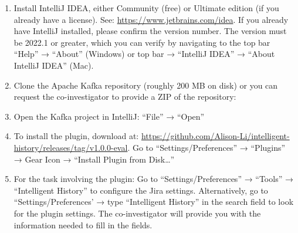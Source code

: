 \begin{enumerate}
    \item Install IntelliJ IDEA, either Community (free) or Ultimate edition (if you already have a license). See: \url{https://www.jetbrains.com/idea}. If you already have IntelliJ installed, please confirm the version number. The version must be 2022.1 or greater, which you can verify by navigating to the top bar  ``Help'' → ``About'' (Windows) or top bar → ``IntelliJ IDEA'' → ``About IntelliJ IDEA'' (Mac).
    \item Clone the Apache Kafka repository (roughly 200 MB on disk) or you can request the co-investigator to provide a ZIP of the repository: 
    
    \begin{center}
    \end{center}

    \item Open the Kafka project in IntelliJ: ``File'' → ``Open''
    \item To install the plugin, download  at: \url{https://github.com/Alison-Li/intelligent-history/releases/tag/v1.0.0-eval}. Go to “Settings/Preferences” → ``Plugins'' → Gear Icon → ``Install Plugin from Disk\dots''
    \item For the task involving the plugin: Go to ``Settings/Preferences'' → ``Tools'' → ``Intelligent History'' to configure the Jira settings. Alternatively, go to “Settings/Preferences’ → type ``Intelligent History'' in the search field to look for the plugin settings. The co-investigator will provide you with the information needed to fill in the fields.
\end{enumerate}

\endinput